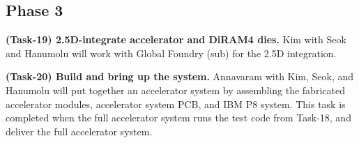\noindent
\subsection{Phase 3}

\noindent
\textbf{(Task-19) 2.5D-integrate accelerator and DiRAM4 dies.}
Kim with Seok and Hanumolu will work with Global Foundry (sub) for the 2.5D integration.


\noindent
\textbf{(Task-20) Build and bring up the system.}
Annavaram with Kim, Seok, and Hanumolu will put together an accelerator system by assembling
the fabricated accelerator modules, accelerator system PCB, and IBM P8 system.
This task is completed when the full accelerator system runs the test code from Task-18, and deliver the full accelerator system.


\begin{comment}
Task 3.X: Our accelerator chip fabrication and chip-level testing \underline{Seok (Columbia), Kim (UIUC), Hanumolu (UIUC), Annavaram (USC), Hwu (UIUC)}
Completion criteria: fabricated chips, verified in the chip level
Approach: We will perform intensive pre-silicon verifications for functional, thermal, voltage integrity, noise, and testability aspects. We will tape-out the accelerator chip in a 28nm CMOS technology. We will test the accelerator chip without DiRAMs. 
Task 3.2: 2.5D integration of our accelerator chip and memory stacks, packaging, and testing \underline{?}
Completion criteria and deliverables: Functioning 2.5D integrated hardware of the accelerators and DiRAMs. 
Approach:  We will integrate the accelerator chip with two DiRAMs using a silicon interposer. 
The silicon interposer that creates 2,000 connection to the accelerator chip per DiRAM will be fabricated by a company (XXXXX). 
The interposer will be either connected to a custom PCB directly or enclosed on a BGA type package. 
If necessary, we will mount a off-the-shelf cooler, potentially modified to fit, on top of the accelerator chip. 
\end{comment}
